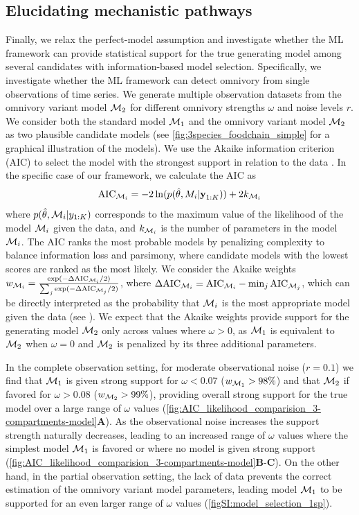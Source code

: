 \subsection{Elucidating mechanistic pathways}
\label{sec:model_comparision}
Finally, we relax the perfect-model assumption and investigate whether the ML framework can provide statistical support for the true generating model among several candidates with information-based model selection.
%
Specifically, we investigate whether the ML framework can detect omnivory from single observations of time series.
%
We generate multiple observation datasets from the omnivory variant model $\mathcal{M}_2$ for different omnivory strengths $\omega$ and noise levels $r$. We consider both the standard model $\mathcal{M}_1$ and the omnivory variant model $\mathcal{M}_2$ as two plausible candidate models (see \cref{fig:3species_foodchain_simple} for a graphical illustration of the models).
% 
We use the Akaike information criterion (AIC) to select the model with the strongest support in relation to the data \cite{Mangan2017}.
% 
In the specific case of our framework, we calculate the AIC as
\begin{equation}
    \text{AIC}_{\mathcal{M}_i} = -2 \ln(p(\hat \theta, M_i | \textbf{y}_{1:K})) + 2 k_{\mathcal{M}_i}
\end{equation}
% 
where $p(\hat \theta , \mathcal{M}_i| y_{1:K})$ corresponds to the maximum value of the likelihood of the model $\mathcal{M}_i$ given the data, and $k_{\mathcal{M}_i}$ is the number of parameters in the model $\mathcal{M}_i$.
% 
The AIC ranks the most probable models by penalizing complexity to balance information loss and parsimony, where candidate models with the lowest scores are ranked as the most likely.
%
We consider the Akaike weights $w_{\mathcal{M}_i} = \tfrac{\exp(- \Delta \text{AIC}_{\mathcal{M}_i}/2)}{\sum_j \exp(- \Delta \text{AIC}_{\mathcal{M}_j} / 2)}$, where $\Delta \text{AIC}_{\mathcal{M}_i} = \text{AIC}_{\mathcal{M}_i} - \min_{j} \text{AIC}_{\mathcal{M}_j}$, which can be directly interpreted as the probability that $\mathcal{M}_i$ is the most appropriate model given the data (see \cite{Burnham2002}).
%
We expect that the Akaike weights provide support for the generating model $\mathcal{M}_2$ only across values where $\omega > 0$, as $\mathcal{M}_1$ is equivalent to $\mathcal{M}_2$ when $\omega = 0$ and $\mathcal{M}_2$ is penalized by its three additional parameters.

In the complete observation setting, for moderate observational noise ($r = 0.1$) we find that $\mathcal{M}_1$ is given strong support for $\omega < 0.07$ ($w_{\mathcal{M}_1} > 98\%$) and that $\mathcal{M}_2$ if favored for $\omega > 0.08$ ($w_{\mathcal{M}_2} > 99\%$), providing overall strong support for the true model over a large range of $\omega$ values (\cref{fig:AIC_likelihood_comparision_3-compartments-model}\textbf{A}). 
%
As the observational noise increases the support strength naturally decreases, leading to an increased range of $\omega$ values where the simplest model $\mathcal{M}_1$ is favored or where no model is given strong support (\cref{fig:AIC_likelihood_comparision_3-compartments-model}\textbf{B}-\textbf{C}).
% 
On the other hand, in the partial observation setting, the lack of data prevents the correct estimation of the omnivory variant model parameters, leading model $\mathcal{M}_1$ to be supported for an even larger range of $\omega$ values (\cref{figSI:model_selection_1sp}).

